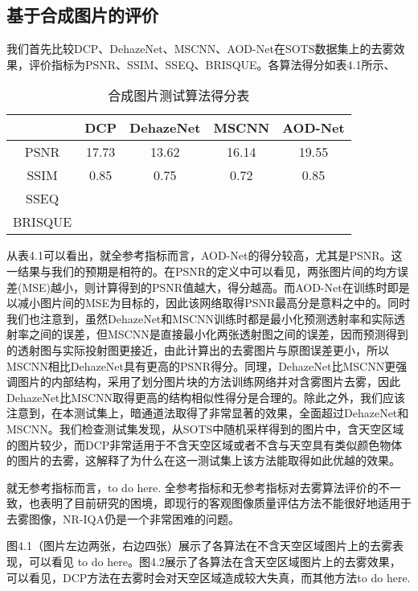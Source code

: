 \documentclass[a4paper, 12pt, oneside]{report}
\begin{document}
{\subsection{基于合成图片的评价\quad}
我们首先比较DCP、DehazeNet、MSCNN、AOD-Net在SOTS数据集上的去雾效果，评价指标为PSNR、SSIM、SSEQ、BRISQUE。各算法得分如表4.1所示、

\begin{table}[htbp]
  \centering
  \caption{合成图片测试算法得分表}
    \begin{tabular}{c|c|c|c|c}
    \hline
         & DCP    & DehazeNet  & MSCNN    & AOD-Net  \\
    \hline
    	PSNR	 & 17.73    & 13.62 & 16.14    & 19.55 \\
	\hline
     SSIM     & 0.85 & 0.75 & 0.72     & 0.85   \\
	\hline
    SSEQ &   &  &     &  \\
    \hline
     BRISQUE     &       &       &   & \\
     \hline
  
    \end{tabular}%
  \label{tab:4.1}%
\end{table}%
从表4.1可以看出，就全参考指标而言，AOD-Net的得分较高，尤其是PSNR。这一结果与我们的预期是相符的。在PSNR的定义中可以看见，两张图片间的均方误差(MSE)越小，则计算得到的PSNR值越大，得分越高。而AOD-Net在训练时即是以减小图片间的MSE为目标的，因此该网络取得PSNR最高分是意料之中的。同时我们也注意到，虽然DehazeNet和MSCNN训练时都是最小化预测透射率和实际透射率之间的误差，但MSCNN是直接最小化两张透射图之间的误差，因而预测得到的透射图与实际投射图更接近，由此计算出的去雾图片与原图误差更小，所以MSCNN相比DehazeNet具有更高的PSNR得分。同理，DehazeNet比MSCNN更强调图片的内部结构，采用了划分图片块的方法训练网络并对含雾图片去雾，因此DehazeNet比MSCNN取得更高的结构相似性得分是合理的。除此之外，我们应该注意到，在本测试集上，暗通道法取得了非常显著的效果，全面超过DehazeNet和MSCNN。我们检查测试集发现，从SOTS中随机采样得到的图片中，含天空区域的图片较少，而DCP非常适用于不含天空区域或者不含与天空具有类似颜色物体的图片的去雾，这解释了为什么在这一测试集上该方法能取得如此优越的效果。

就无参考指标而言，to do here. 全参考指标和无参考指标对去雾算法评价的不一致，也表明了目前研究的困境，即现行的客观图像质量评估方法不能很好地适用于去雾图像，NR-IQA仍是一个非常困难的问题。

图4.1（图片左边两张，右边四张）展示了各算法在不含天空区域图片上的去雾表现，可以看见 to do here。图4.2展示了各算法在含天空区域图片上的去雾效果，可以看见，DCP方法在去雾时会对天空区域造成较大失真，而其他方法to do here.

}
\end{document}
